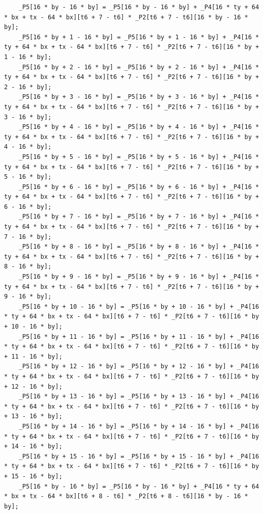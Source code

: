 \documentclass[msthesis,justified,copyright,final,numbers,sort&compress,
gsmodern,amstex,natbib]{uothesis}
\begin{document}
\begin{lstlisting}
    _P5[16 * by - 16 * by] = _P5[16 * by - 16 * by] + _P4[16 * ty + 64 * bx + tx - 64 * bx][t6 + 7 - t6] * _P2[t6 + 7 - t6][16 * by - 16 * by];
    _P5[16 * by + 1 - 16 * by] = _P5[16 * by + 1 - 16 * by] + _P4[16 * ty + 64 * bx + tx - 64 * bx][t6 + 7 - t6] * _P2[t6 + 7 - t6][16 * by + 1 - 16 * by];
    _P5[16 * by + 2 - 16 * by] = _P5[16 * by + 2 - 16 * by] + _P4[16 * ty + 64 * bx + tx - 64 * bx][t6 + 7 - t6] * _P2[t6 + 7 - t6][16 * by + 2 - 16 * by];
    _P5[16 * by + 3 - 16 * by] = _P5[16 * by + 3 - 16 * by] + _P4[16 * ty + 64 * bx + tx - 64 * bx][t6 + 7 - t6] * _P2[t6 + 7 - t6][16 * by + 3 - 16 * by];
    _P5[16 * by + 4 - 16 * by] = _P5[16 * by + 4 - 16 * by] + _P4[16 * ty + 64 * bx + tx - 64 * bx][t6 + 7 - t6] * _P2[t6 + 7 - t6][16 * by + 4 - 16 * by];
    _P5[16 * by + 5 - 16 * by] = _P5[16 * by + 5 - 16 * by] + _P4[16 * ty + 64 * bx + tx - 64 * bx][t6 + 7 - t6] * _P2[t6 + 7 - t6][16 * by + 5 - 16 * by];
    _P5[16 * by + 6 - 16 * by] = _P5[16 * by + 6 - 16 * by] + _P4[16 * ty + 64 * bx + tx - 64 * bx][t6 + 7 - t6] * _P2[t6 + 7 - t6][16 * by + 6 - 16 * by];
    _P5[16 * by + 7 - 16 * by] = _P5[16 * by + 7 - 16 * by] + _P4[16 * ty + 64 * bx + tx - 64 * bx][t6 + 7 - t6] * _P2[t6 + 7 - t6][16 * by + 7 - 16 * by];
    _P5[16 * by + 8 - 16 * by] = _P5[16 * by + 8 - 16 * by] + _P4[16 * ty + 64 * bx + tx - 64 * bx][t6 + 7 - t6] * _P2[t6 + 7 - t6][16 * by + 8 - 16 * by];
    _P5[16 * by + 9 - 16 * by] = _P5[16 * by + 9 - 16 * by] + _P4[16 * ty + 64 * bx + tx - 64 * bx][t6 + 7 - t6] * _P2[t6 + 7 - t6][16 * by + 9 - 16 * by];
    _P5[16 * by + 10 - 16 * by] = _P5[16 * by + 10 - 16 * by] + _P4[16 * ty + 64 * bx + tx - 64 * bx][t6 + 7 - t6] * _P2[t6 + 7 - t6][16 * by + 10 - 16 * by];
    _P5[16 * by + 11 - 16 * by] = _P5[16 * by + 11 - 16 * by] + _P4[16 * ty + 64 * bx + tx - 64 * bx][t6 + 7 - t6] * _P2[t6 + 7 - t6][16 * by + 11 - 16 * by];
    _P5[16 * by + 12 - 16 * by] = _P5[16 * by + 12 - 16 * by] + _P4[16 * ty + 64 * bx + tx - 64 * bx][t6 + 7 - t6] * _P2[t6 + 7 - t6][16 * by + 12 - 16 * by];
    _P5[16 * by + 13 - 16 * by] = _P5[16 * by + 13 - 16 * by] + _P4[16 * ty + 64 * bx + tx - 64 * bx][t6 + 7 - t6] * _P2[t6 + 7 - t6][16 * by + 13 - 16 * by];
    _P5[16 * by + 14 - 16 * by] = _P5[16 * by + 14 - 16 * by] + _P4[16 * ty + 64 * bx + tx - 64 * bx][t6 + 7 - t6] * _P2[t6 + 7 - t6][16 * by + 14 - 16 * by];
    _P5[16 * by + 15 - 16 * by] = _P5[16 * by + 15 - 16 * by] + _P4[16 * ty + 64 * bx + tx - 64 * bx][t6 + 7 - t6] * _P2[t6 + 7 - t6][16 * by + 15 - 16 * by];
    _P5[16 * by - 16 * by] = _P5[16 * by - 16 * by] + _P4[16 * ty + 64 * bx + tx - 64 * bx][t6 + 8 - t6] * _P2[t6 + 8 - t6][16 * by - 16 * by];

\end{lstlisting}
\end{document}
